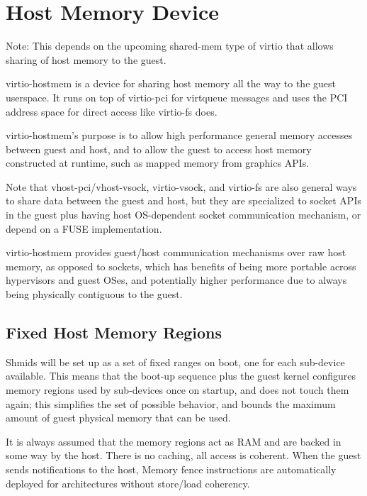 \section{Host Memory Device}\label{sec:Device Types / Host Memory Device}

Note: This depends on the upcoming shared-mem type of virtio
that allows sharing of host memory to the guest.

virtio-hostmem is a device for sharing host memory all the way to the guest userspace.
It runs on top of virtio-pci for virtqueue messages and
uses the PCI address space for direct access like virtio-fs does.

virtio-hostmem's purpose is
to allow high performance general memory accesses between guest and host,
and to allow the guest to access host memory constructed at runtime,
such as mapped memory from graphics APIs.

Note that vhost-pci/vhost-vsock, virtio-vsock, and virtio-fs
are also general ways to share data between the guest and host,
but they are specialized to socket APIs in the guest plus
having host OS-dependent socket communication mechanism,
or depend on a FUSE implementation.

virtio-hostmem provides guest/host communication mechanisms over raw host memory,
as opposed to sockets,
which has benefits of being more portable across hypervisors and guest OSes,
and potentially higher performance due to always being physically contiguous to the guest.

\subsection{Fixed Host Memory Regions}\label{sec:Device Types / Host Memory Device / Communication over Fixed Host Memory Regions}

Shmids will be set up as a set of fixed ranges on boot,
one for each sub-device available.
This means that the boot-up sequence plus the guest kernel
configures memory regions used by sub-devices once on startup,
and does not touch them again;
this simplifies the set of possible behavior,
and bounds the maximum amount of guest physical memory that can be used.

It is always assumed that the memory regions act as RAM
and are backed in some way by the host.
There is no caching, all access is coherent.
When the guest sends notifications to the host,
Memory fence instructions are automatically deployed
for architectures without store/load coherency.

